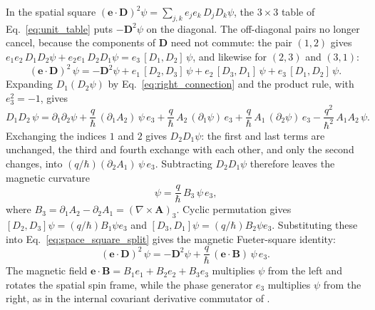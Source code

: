 \documentclass[aps,prd,onecolumn,tightenlines,nofootinbib,notitlepage,11pt,floatfix]{revtex4-2}
\theoremstyle{indentedtheorem}
\begin{document}
In the spatial square $(\mathbf{e}\cdot\mathbf{D})^2\psi = \sum_{j,k} e_j e_k\,D_j D_k\psi$, the $3\times 3$ table of Eq.~\eqref{eq:unit_table} puts $-\mathbf{D}^2\psi$ on the diagonal. The off-diagonal pairs no longer cancel, because the components of $\mathbf{D}$ need not commute: the pair $(1,2)$ gives $e_1e_2\,D_1D_2\psi+e_2e_1\,D_2D_1\psi=e_3\,[D_1,D_2]\,\psi$, and likewise for $(2,3)$ and $(3,1)$:
\begin{equation}
    (\mathbf{e}\cdot\mathbf{D})^2\,\psi = -\mathbf{D}^2\psi + e_1\,[D_2,D_3]\,\psi + e_2\,[D_3,D_1]\,\psi + e_3\,[D_1,D_2]\,\psi .
    \label{eq:space_square_split}
\end{equation}
Expanding $D_1(D_2\psi)$ by Eq.~\eqref{eq:right_connection} and the product rule, with $e_3^2=-1$, gives
\begin{equation}
    D_1D_2\,\psi = \partial_1\partial_2\psi + \frac{q}{\hbar}\,(\partial_1A_2)\,\psi\,e_3 + \frac{q}{\hbar}\,A_2\,(\partial_1\psi)\,e_3 + \frac{q}{\hbar}\,A_1\,(\partial_2\psi)\,e_3 - \frac{q^2}{\hbar^2}\,A_1A_2\,\psi .
    \label{eq:double_connection}
\end{equation}
Exchanging the indices $1$ and $2$ gives $D_2D_1\psi$: the first and last terms are unchanged, the third and fourth exchange with each other, and only the second changes, into $(q/\hbar)(\partial_2A_1)\,\psi\,e_3$. Subtracting $D_2D_1\psi$ therefore leaves the magnetic curvature
\begin{equation}
    [D_1,D_2]\,\psi = \frac{q}{\hbar}\,B_3\,\psi\,e_3 ,
    \label{eq:phase_curvature}
\end{equation}
where $B_3 = \partial_1 A_2 - \partial_2 A_1 = (\nabla\times\mathbf{A})_3$. Cyclic permutation gives $[D_2,D_3]\psi = (q/\hbar)B_1\psi e_3$ and $[D_3,D_1]\psi = (q/\hbar)B_2\psi e_3$. Substituting these into Eq.~\eqref{eq:space_square_split} gives the magnetic Fueter-square identity:
\begin{equation}
    (\mathbf{e}\cdot\mathbf{D})^2\,\psi = -\mathbf{D}^2\psi + \frac{q}{\hbar}\,(\mathbf{e}\cdot\mathbf{B})\,\psi\,e_3 .
    \label{eq:fueter_square}
\end{equation}
The magnetic field $\mathbf{e}\cdot\mathbf{B}=B_1e_1+B_2e_2+B_3e_3$ multiplies $\psi$ from the left and rotates the spatial spin frame, while the phase generator $e_3$ multiplies $\psi$ from the right, as in the internal covariant derivative commutator of \citet{LasenbyDoranGull1998Gravity}.
\end{document}
